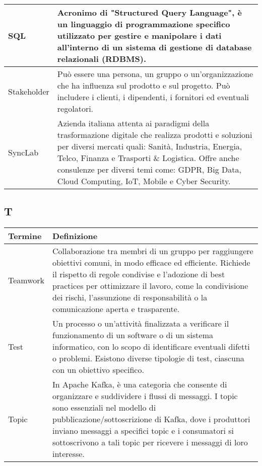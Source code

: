 \documentclass[10pt]{article}
\begin{document}
\begin{longtable}{|>{\centering\arraybackslash}m{2.5cm}|>{\arraybackslash}m{12.5cm}|}
SQL & Acronimo di "Structured Query Language", è un linguaggio di programmazione specifico utilizzato per gestire e manipolare i dati all'interno di un sistema di gestione di database relazionali (RDBMS).\\
\hline
Stakeholder & Può essere una persona, un gruppo o un'organizzazione che ha influenza sul prodotto e sul progetto. Può includere i clienti, i dipendenti, i fornitori ed eventuali regolatori.\\
\hline
SyncLab & Azienda italiana attenta ai paradigmi della trasformazione digitale che realizza prodotti e soluzioni per diversi mercati quali: Sanità, Industria, Energia, Telco, Finanza e Trasporti \& Logistica. Offre anche consulenze per diversi temi come: GDPR, Big Data, Cloud Computing, IoT, Mobile e Cyber Security.\\
\hline
\end{longtable}

\subsection{T} %
\begin{longtable}{|>{\centering\arraybackslash}m{2.5cm}|>{\arraybackslash}m{12.5cm}|}
\hline
\rowcolor[gray]{0.8}
\textbf{Termine} & \textbf{Definizione}\\
\endhead
\hline
Teamwork & Collaborazione tra membri di un gruppo per raggiungere obiettivi comuni, in modo efficace ed efficiente. Richiede il rispetto di regole condivise e l'adozione di best practices per ottimizzare il lavoro, come la condivisione dei rischi, l'assunzione di responsabilità o la comunicazione aperta e trasparente.\\
\hline
Test & Un processo o un'attività finalizzata a verificare il funzionamento di un software o di un sistema informatico, con lo scopo di identificare eventuali difetti o problemi. Esistono diverse tipologie di test, ciascuna con un obiettivo specifico.\\
\hline
Topic & In Apache Kafka, è una categoria che consente di organizzare e suddividere i flussi di messaggi. I topic sono essenziali nel modello di pubblicazione/sottoscrizione di Kafka, dove i produttori inviano messaggi a specifici topic e i consumatori si sottoscrivono a tali topic per ricevere i messaggi di loro interesse.\\
\hline
\end{longtable}
\end{document}
